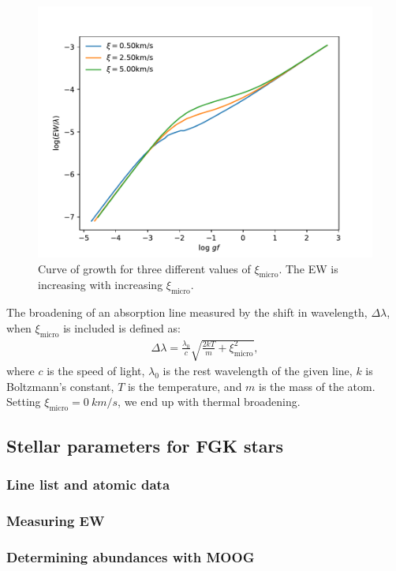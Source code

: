 \begin{figure}[htpb!]
    \centering
    \includegraphics[width=1.0\linewidth]{figures/cog_vt.pdf}
    \caption{Curve of growth for three different values of $\xi_\mathrm{micro}$.
             The EW is increasing with increasing $\xi_\mathrm{micro}$.}
    \label{fig:cog_vt}
\end{figure}

The broadening of an absorption line measured by the shift in wavelength,
$\Delta\lambda$, when $\xi_\mathrm{micro}$ is included is defined as:
\begin{align}
  \Delta\lambda = \frac{\lambda_0}{c} \sqrt{\frac{2kT}{m} + \xi_\mathrm{micro}^2},
\end{align}
where $c$ is the speed of light, $\lambda_0$ is the rest wavelength of the given
line, $k$ is Boltzmann's constant, $T$ is the temperature, and $m$ is the mass
of the atom. Setting $\xi_\mathrm{micro}=\SI{0}{km/s}$, we end up with thermal
broadening.


\subsection{Stellar parameters for FGK stars}

\subsubsection{Line list and atomic data}

\subsubsection{Measuring EW}
\label{sec:measureEW}

\subsubsection{Determining abundances with MOOG}
